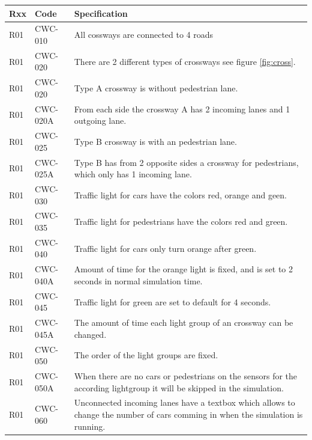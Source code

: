 \begin{tabularx}{\textwidth}{|p{0.5cm}p{2cm}X|}\hline
	Rxx & Code & Specification \\\hline
	R01 & CWC-010 & All cossways are connected to 4 roads\\\hline
	R01 & CWC-020 & There are 2 different types of crossways see figure \ref{fig:cross}.\\\hline
	R01 & CWC-020 & Type A crossway is without pedestrian lane.\\\hline
	R01 & CWC-020A & From each side the crossway A has 2 incoming lanes and 1 outgoing lane.\\\hline
	R01 & CWC-025 & Type B crossway is with an pedestrian lane.\\\hline
	R01 & CWC-025A & Type B has from 2 opposite sides a crossway for pedestrians, which only has 1 incoming lane.\\\hline
	R01 & CWC-030 & Traffic light for cars have the colors red, orange and geen.\\\hline
	R01 & CWC-035 & Traffic light for pedestrians have the colors red and green.\\\hline
	R01 & CWC-040 & Traffic light for cars only turn orange after green.\\\hline
	R01 & CWC-040A & Amount of time for the orange light is fixed, and is set to 2 seconds in normal simulation time.\\\hline
	R01 & CWC-045 & Traffic light for green are set to default for 4 seconds.\\\hline
	R01 & CWC-045A & The amount of time each light group of an crossway can be changed.\\\hline
	R01 & CWC-050 & The order of the light groups are fixed.\\\hline
	R01 & CWC-050A & When there are no cars or pedestrians on the sensors for the according lightgroup it will be skipped in the simulation.\\\hline
	R01 & CWC-060 & Unconnected incoming lanes have a textbox which allows to change the number of cars comming in when the simulation is running.\\\hline
\end{tabularx}

\newpage
